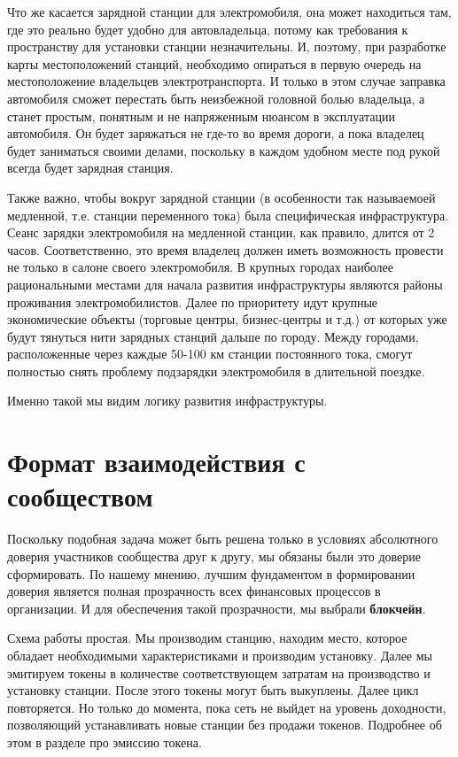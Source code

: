 \documentclass[a4paper,12pt]{report}
\begin{document}
Что же касается зарядной станции для электромобиля, она может находиться там, где это реально будет удобно для автовладельца, потому как требования к пространству для установки станции незначительны. И, поэтому, при разработке карты местоположений станций, необходимо опираться в первую очередь на местоположение владельцев электротранспорта. И только в этом случае заправка автомобиля сможет перестать быть неизбежной головной болью владельца, а станет простым, понятным и не напряженным нюансом в эксплуатации автомобиля. Он будет заряжаться не где-то во время дороги, а пока владелец будет заниматься своими делами, поскольку в каждом удобном месте под рукой всегда будет зарядная станция.

Также важно, чтобы вокруг зарядной станции (в особенности так называемоей медленной, т.е. станции переменного тока) была специфическая инфраструктура. Сеанс зарядки электромобиля на медленной станции, как правило, длится от 2 часов. Соответственно, это время владелец должен иметь возможность провести не только в салоне своего электромобиля. В крупных городах наиболее рациональными местами для начала развития инфраструктуры являются районы проживания электромобилистов. Далее по приоритету идут крупные экономические объекты (торговые центры, бизнес-центры и т.д.) от которых уже будут тянуться нити зарядных станций дальше по городу. Между городами, расположенные через каждые 50-100 км станции постоянного тока, смогут полностью снять проблему подзарядки электромобиля в длительной поездке. 

Именно такой мы видим логику развития инфраструктуры.


\vspace*{1cm}

\chapter{Формат взаимодействия с сообществом}
Поскольку подобная задача может быть решена только в условиях абсолютного доверия участников сообщества друг к другу, мы обязаны были это доверие сформировать. По нашему мнению, лучшим фундаментом в формировании доверия является полная прозрачность всех финансовых процессов в организации. И для обеспечения такой прозрачности, мы выбрали \textbf{блокчейн}. 

Схема работы простая. Мы производим станцию, находим место, которое обладает необходимыми характеристиками и производим установку. Далее мы эмитируем токены в количестве соответствующем затратам на производство и установку станции. После этого токены могут быть выкуплены. Далее цикл повторяется. Но только до момента, пока сеть не выйдет на уровень доходности, позволяющий устанавливать новые станции без продажи токенов. Подробнее об этом в разделе про эмиссию токена. 
\end{document}
